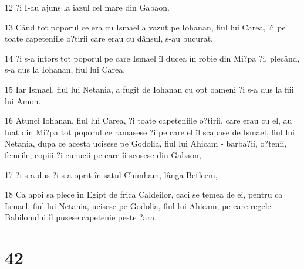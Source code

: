 \par 12 ?i I-au ajuns la iazul cel mare din Gabaon.
\par 13 Când tot poporul ce era cu Ismael a vazut pe Iohanan, fiul lui Carea, ?i pe toate capeteniile o?tirii care erau cu dânsul, s-au bucurat.
\par 14 ?i s-a întors tot poporul pe care Ismael îl ducea în robie din Mi?pa ?i, plecând, s-a dus la Iohanan, fiul lui Carea,
\par 15 Iar Ismael, fiul lui Netania, a fugit de Iohanan cu opt oameni ?i s-a dus la fiii lui Amon.
\par 16 Atunci Iohanan, fiul lui Carea, ?i toate capeteniile o?tirii, care erau cu el, au luat din Mi?pa tot poporul ce ramasese ?i pe care el îl scapase de Ismael, fiul lui Netania, dupa ce acesta ucisese pe Godolia, fiul lui Ahicam - barba?ii, o?tenii, femeile, copiii ?i eunucii pe care îi scosese din Gabaon,
\par 17 ?i s-a dus ?i s-a oprit în satul Chimham, lânga Betleem,
\par 18 Ca apoi sa plece în Egipt de frica Caldeilor, caci se temea de ei, pentru ca Ismael, fiul lui Netania, ucisese pe Godolia, fiul lui Ahicam, pe care regele Babilonului îl pusese capetenie peste ?ara.

\chapter{42}

